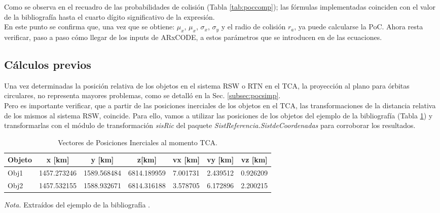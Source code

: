 \vspace{0.5cm}
Como se observa en el recuadro de las probabilidades de colisi\'on (Tabla \ref{tab:poccomp}); las f\'ormulas implementadas coinciden con el valor de la bibliograf\'ia hasta el cuarto d\'igito significativo de la expresi\'on.\\

En este punto se confirma que, una vez que se obtiene: $\mu_{x}$, $\mu_{x}$, $\sigma_{x}$, $\sigma_{y}$ y el radio de colisi\'on $r_{a}$, ya puede calcularse la PoC. 
Ahora resta verificar, paso a paso c\'omo llegar de los inputs de ARxCODE, a estos par\'ametros que se introducen en de las ecuaciones. \\

\subsection*{C\'alculos previos}

Una vez determinadas la posici\'on relativa de los objetos en el sistema RSW o RTN en el TCA, la proyecci\'on al plano para \'orbitas circulares, no representa mayores problemas, como se detall\'o en la Sec. \ref{subsec:pocsimp}.\\

Pero es importante verificar, que a partir de las posiciones inerciales de los objetos en el TCA, las transformaciones de la distancia relativa de los mismos al sistema RSW, coincide.
Para ello, vamos a utilizar las posiciones de los objetos del ejemplo de la bibliograf\'ia (Tabla \ref{tab:vectejemplo}) y transformarlas con el m\'odulo de transformaci\'on {\it{sisRic}} del paquete {\it{SistReferencia.SistdeCoordenadas}} para corroborar los resultados.
\\

\begin{table}[!h]
\caption{Vectores de Posiciones Inerciales al momento TCA.}
\begin{tabular}{lcccccc}
\hline
Objeto & x [km] & y [km] &z[km] &vx [km] &vy [km] &vz [km]\\
\hline
Obj1 & 1457.273246 &1589.568484&6814.189959&7.001731&2.439512&0.926209\\
Obj2 & 1457.532155&1588.932671&6814.316188&3.578705&6.172896&2.200215\\
\hline
\end{tabular}
\label{tab:vectejemplo}
\begin{flushleft}
\small {\it{Nota.}} Extra\'idos del ejemplo de la bibliograf\'ia \citep{leichen}.
\end{flushleft}
\end{table}

